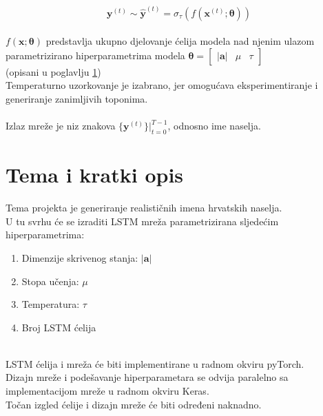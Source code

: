 \documentclass{report}
\begin{document}
\begin{equation}
 \mathbf{y}^{(t)} \sim \hat{\mathbf{y}}^{(t)} = \sigma_{\tau}(f(\mathbf{x}^{(t)} ; \boldsymbol{\theta}))
\end{equation}
\ \\
$f(\mathbf{x} ; \boldsymbol{\theta})$ predstavlja ukupno djelovanje ćelija modela nad njenim ulazom parametrizirano hiperparametrima modela $\boldsymbol{\theta} = \begin{bmatrix} \lvert \mathbf{a} \rvert & \mu & \tau \end{bmatrix}$\\ (opisani u poglavlju \ref{sec_tema})
\ \\
Temperaturno uzorkovanje je izabrano, jer omogućava eksperimentiranje i generiranje zanimljivih toponima.\\
\\
Izlaz mreže je niz znakova $\{\mathbf{y}^{(t)}\} \biggr \rvert_{t=0}^{T-1}$, odnosno ime naselja.

\section{Tema i kratki opis}
\label{sec_tema}
Tema projekta je generiranje realističnih imena hrvatskih naselja.\\
U tu svrhu će se izraditi LSTM mreža parametrizirana sljedećim hiperparametrima:
\begin{enumerate}
\item Dimenzije skrivenog stanja: $\lvert \mathbf{a} \rvert$
\item Stopa učenja: $\mu$
\item Temperatura: $\tau$
\item Broj LSTM ćelija
\end{enumerate}
\ \\
LSTM ćelija i mreža će biti implementirane u radnom okviru pyTorch.\\
Dizajn mreže i podešavanje hiperparametara se odvija paralelno sa implementacijom mreže u radnom okviru Keras.\\
Točan izgled ćelije i dizajn mreže će biti određeni naknadno.\\
\end{document}
